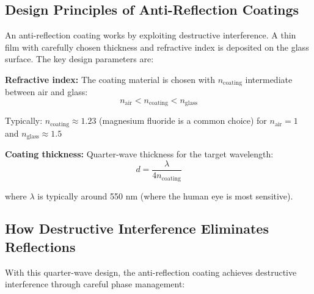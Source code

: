 \documentclass[
  a4paper,
]{book}
\begin{document}
\subsection{Design Principles of Anti-Reflection
Coatings}\label{design-principles-of-anti-reflection-coatings}

An anti-reflection coating works by exploiting destructive interference.
A thin film with carefully chosen thickness and refractive index is
deposited on the glass surface. The key design parameters are:

\begin{tcolorbox}[enhanced jigsaw, breakable, toptitle=1mm, bottomrule=.15mm, colbacktitle=quarto-callout-important-color!10!white, title=\textcolor{quarto-callout-important-color}{\faExclamation}\hspace{0.5em}{Anti-Reflection Coating Design}, arc=.35mm, rightrule=.15mm, bottomtitle=1mm, opacityback=0, toprule=.15mm, coltitle=black, leftrule=.75mm, opacitybacktitle=0.6, colback=white, left=2mm, titlerule=0mm, colframe=quarto-callout-important-color-frame]

\textbf{Refractive index:} The coating material is chosen with
\(n_{\text{coating}}\) intermediate between air and glass:
\[n_{\text{air}} < n_{\text{coating}} < n_{\text{glass}}\]

Typically: \(n_{\text{coating}} \approx 1.23\) (magnesium fluoride is a
common choice) for \(n_{\text{air}} = 1\) and
\(n_{\text{glass}} \approx 1.5\)

\textbf{Coating thickness:} Quarter-wave thickness for the target
wavelength: \[d = \frac{\lambda}{4n_{\text{coating}}}\]

where \(\lambda\) is typically around 550 nm (where the human eye is
most sensitive).

\end{tcolorbox}

\subsection{How Destructive Interference Eliminates
Reflections}\label{how-destructive-interference-eliminates-reflections}

With this quarter-wave design, the anti-reflection coating achieves
destructive interference through careful phase management:
\end{document}
